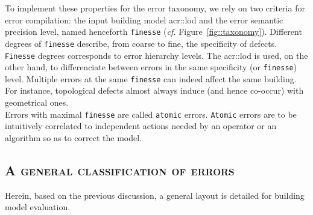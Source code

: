             To implement these properties for the error taxonomy, we rely on two criteria for error compilation: the input building model \gls{acr::lod} and the error semantic precision level, named henceforth \texttt{finesse} (\textit{cf.} Figure~\ref{fig::taxonomy}).
            Different degrees of \texttt{finesse} describe, from coarse to fine, the specificity of defects.
            \texttt{Finesse} degrees corresponds to error hierarchy levels.
            The \gls{acr::lod} is used, on the other hand, to differenciate between errors in the same specificity (or \texttt{finesse}) level.
            Multiple errors at the same \texttt{finesse} can indeed affect the same building.
            For instance, topological defects almost always induce (and hence co-occur) with geometrical ones.\\
            Errors with maximal \texttt{finesse} are called \texttt{atomic} errors.
            \texttt{Atomic} errors are to be intuitively correlated to independent actions needed by an operator or an algorithm so as to correct the model.

    \subsection{\textsc{A general classification of errors}}
        \label{subsec::semantic_evaluation::general_framework::error_classification}
        Herein, based on the previous discussion, a general layout is detailed for building model evaluation.

